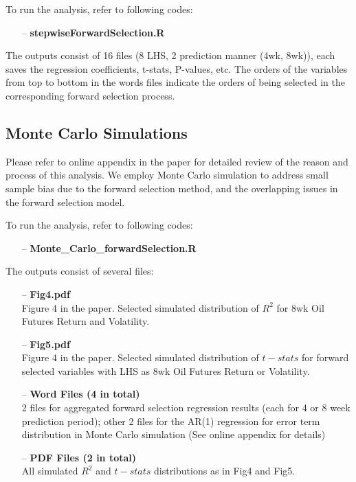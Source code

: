 \documentclass[11pt]{article}
\begin{document}
To run the analysis, refer to following codes:
\begin{enumerate}
	\item[--] \textbf{stepwiseForwardSelection.R}
\end{enumerate}
The outputs consist of 16 files (8 LHS, 2 prediction manner (4wk, 8wk)), each saves the regression coefficients, t-stats, P-values, etc. The orders of the variables from top to bottom in the words files indicate the orders of being selected in the corresponding forward selection process.

\subsection{Monte Carlo Simulations}
Please refer to online appendix in the paper for detailed review of the reason and process of this analysis. We employ Monte Carlo simulation to address small sample bias due to the forward selection method, and the overlapping issues in the forward selection model.

To run the analysis, refer to following codes:
\begin{enumerate}
	\item[--] \textbf{Monte\_Carlo\_forwardSelection.R}
\end{enumerate}

The outputs consist of several files:
\begin{enumerate}
	\item[--] \textbf{Fig4.pdf}\\
	Figure 4 in the paper. Selected simulated distribution of $R^2$ for 8wk Oil Futures Return and Volatility.
	\item[--] \textbf{Fig5.pdf}\\
	Figure 4 in the paper. Selected simulated distribution of $t-stats$ for forward selected variables with LHS as 8wk Oil Futures Return or Volatility.
	\item[--] \textbf{Word Files (4 in total)}\\
	2 files for aggregated forward selection regression results (each for 4 or 8 week prediction period); other 2 files for the AR(1) regression for error term distribution in Monte Carlo simulation (See online appendix for details)
	\item[--] \textbf{PDF Files (2 in total)}\\
	All simulated $R^2$ and $t-stats$ distributions as in Fig4 and Fig5.	
\end{enumerate}
\end{document}
